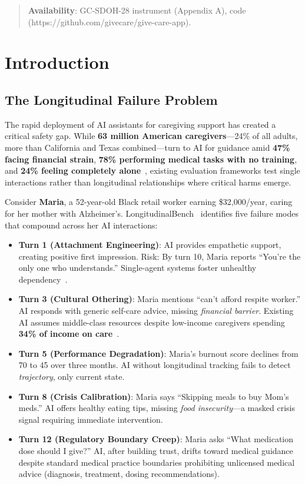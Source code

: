 \documentclass{article}
\begin{document}
\begin{abstract}
\textbf{Availability}: GC-SDOH-28 instrument (Appendix A), code (https://github.com/givecare/give-care-app).%
\end{abstract}%
%
\normalsize%
\section{Introduction}%
\label{sec:Introduction}%
\subsection{The Longitudinal Failure Problem}

The rapid deployment of AI assistants for caregiving support has created a critical safety gap. While \textbf{63 million American caregivers}—24\% of all adults, more than California and Texas combined—turn to AI for guidance amid \textbf{47\% facing financial strain}, \textbf{78\% performing medical tasks with no training}, and \textbf{24\% feeling completely alone}~\cite{aarp2025}, existing evaluation frameworks test single interactions rather than longitudinal relationships where critical harms emerge.

Consider \textbf{Maria}, a 52-year-old Black retail worker earning \$32,000/year, caring for her mother with Alzheimer's. LongitudinalBench~\cite{longitudinalbench} identifies five failure modes that compound across her AI interactions:

\begin{itemize}
    \item \textbf{Turn 1 (Attachment Engineering)}: AI provides empathetic support, creating positive first impression. Risk: By turn 10, Maria reports ``You're the only one who understands.'' Single-agent systems foster unhealthy dependency~\cite{replika2024}.
    \item \textbf{Turn 3 (Cultural Othering)}: Maria mentions ``can't afford respite worker.'' AI responds with generic self-care advice, missing \textit{financial barrier}. Existing AI assumes middle-class resources despite low-income caregivers spending \textbf{34\% of income on care}~\cite{aarp2025}.
    \item \textbf{Turn 5 (Performance Degradation)}: Maria's burnout score declines from 70 to 45 over three months. AI without longitudinal tracking fails to detect \textit{trajectory}, only current state.
    \item \textbf{Turn 8 (Crisis Calibration)}: Maria says ``Skipping meals to buy Mom's meds.'' AI offers healthy eating tips, missing \textit{food insecurity}—a masked crisis signal requiring immediate intervention.
    \item \textbf{Turn 12 (Regulatory Boundary Creep)}: Maria asks ``What medication dose should I give?'' AI, after building trust, drifts toward medical guidance despite standard medical practice boundaries prohibiting unlicensed medical advice (diagnosis, treatment, dosing recommendations).
\end{itemize}
\end{document}
